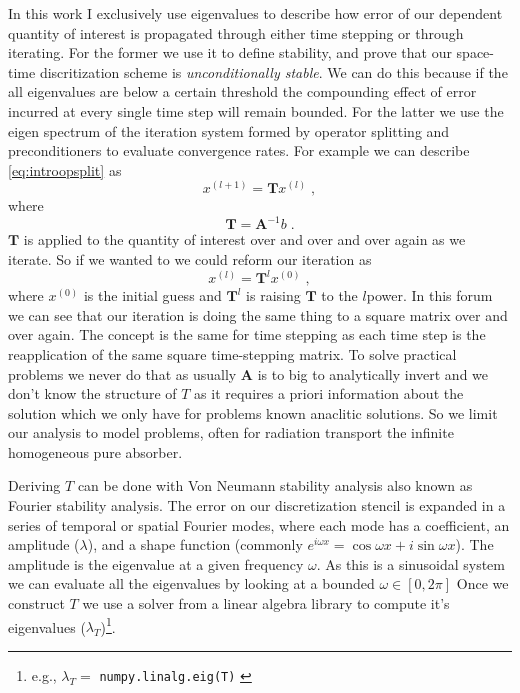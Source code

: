 In this work I exclusively use eigenvalues to describe how error of our dependent quantity of interest is propagated through either time stepping or through iterating.
For the former we use it to define stability, and prove that our space-time discritization scheme is \emph{unconditionally stable}.
We can do this because if the all eigenvalues are below a certain threshold the compounding effect of error incurred at every single time step will remain bounded.
For the latter we use the eigen spectrum of the iteration system formed by operator splitting and preconditioners to evaluate convergence rates.
For example we can describe \eqref{eq:introopsplit} as
\begin{equation}
    x^{(l+1)} = \bm{T}x^{(l)} \; ,
\end{equation}
where 
\begin{equation}
    \bm{T} = \bm{A}^{-1}b \; .
\end{equation}
$\bm{T}$ is applied to the quantity of interest over and over and over again as we iterate.
So if we wanted to we could reform our iteration as
\begin{equation}
    x^{(l)} = \bm{T}^{l}x^{(0)} \; ,
\end{equation}
where $x^{(0)}$ is the initial guess and $\bm{T}^{l}$ is raising $\bm{T}$ to the $l$\ths power.
In this forum we can see that our iteration is doing the same thing to a square matrix over and over again.
The concept is the same for time stepping as each time step is the reapplication of the same square time-stepping matrix.
To solve practical problems we never do that as usually $\bm{A}$ is to big to analytically invert and we don't know the structure of $T$ as it requires a priori information about the solution which we only have for problems known anaclitic solutions.
So we limit our analysis to model problems, often for radiation transport the infinite homogeneous pure absorber.

Deriving $T$ can be done with Von Neumann stability analysis also known as Fourier stability analysis.
The error on our discretization stencil is expanded in a series of temporal or spatial Fourier modes, where each mode has a coefficient, an amplitude ($\lambda$), and a shape function (commonly $e^{i\omega x}=\cos{\omega x} + i\sin{\omega x}$).
The amplitude is the eigenvalue at a given frequency $\omega$.
As this is a sinusoidal system we can evaluate all the eigenvalues by looking at a bounded $\omega \in [0, 2\pi]$
Once we construct $T$ we use a solver from a linear algebra library to compute it's eigenvalues ($\lambda_T$)\footnote{e.g., $\lambda_T =$ \texttt{numpy.linalg.eig(T)} \cite{van_der_walt_numpy_2011}}.

